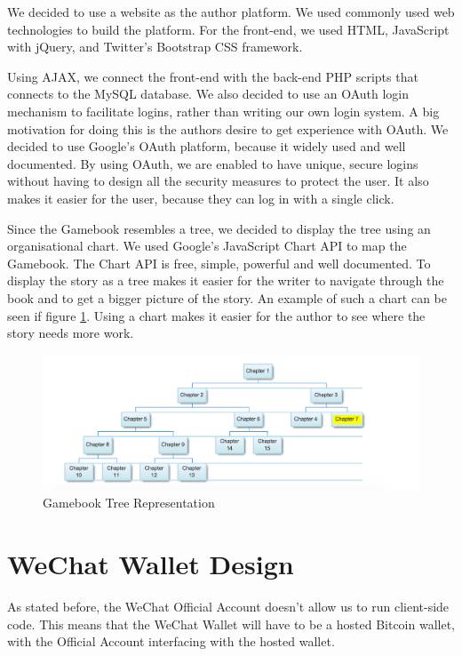 We decided to use a website as the author platform. We used commonly used web technologies to build the platform. For the front-end, we used HTML, JavaScript with jQuery, and Twitter's Bootstrap CSS framework.

Using AJAX, we connect the front-end with the back-end PHP scripts that connects to the MySQL database. We also decided to use an OAuth login mechanism to facilitate logins, rather than writing our own login system. A big motivation for doing this is the authors desire to get experience with OAuth. We decided to use Google's OAuth platform, because it widely used and well documented. By using OAuth, we are enabled to have unique, secure logins without having to design all the security measures to protect the user. It also makes it easier for the user, because they can log in with a single click.

Since the Gamebook resembles a tree, we decided to display the tree using an organisational chart. We used Google's JavaScript Chart API to map the Gamebook. The Chart API is free, simple, powerful and well documented. To display the story as a tree makes it easier for the writer to navigate through the book and to get a bigger picture of the story. An example of such a chart can be seen if figure \ref{fig:gamebook_tree}. Using a chart makes it easier for the author to see where the story needs more work.

\begin{figure}
  \centering
    \includegraphics[width=\textwidth]{figs/gamebook_tree.pdf}
   \caption{Gamebook Tree Representation} 
   \label{fig:gamebook_tree}
\end{figure}


\section{WeChat Wallet Design}
\label{sct:wechat_wallet_design}

As stated before, the WeChat Official Account doesn't allow us to run client-side code. This means that the WeChat Wallet will have to be a hosted Bitcoin wallet, with the Official Account interfacing with the hosted wallet.

